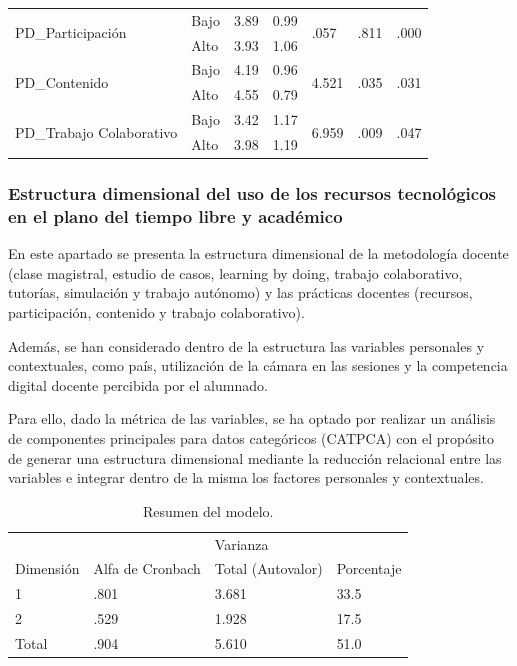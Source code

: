\documentclass[spanish]{textolivre}
\begin{document}
\begin{table}[h]
\begin{threeparttable}
\begin{tabular}{*{7}{l}}
    \multirow{2}{*}{PD\_Participación} & Bajo & 3.89 & 0.99 & \multirow{2}{*}{.057} & \multirow{2}{*}{.811} & \multirow{2}{*}{.000} \\
    & Alto & 3.93 & 1.06 & & & \\
    \multirow{2}{*}{PD\_Contenido} & Bajo & 4.19 & 0.96 & \multirow{2}{*}{4.521} & \multirow{2}{*}{.035} & \multirow{2}{*}{.031} \\
    & Alto & 4.55 & 0.79 & & & \\
    \multirow{2}{*}{PD\_Trabajo Colaborativo} & Bajo & 3.42 & 1.17 & \multirow{2}{*}{6.959} & \multirow{2}{*}{.009} & \multirow{2}{*}{.047} \\
    & Alto & 3.98 & 1.19 & & & \\
    \bottomrule
    \end{tabular}
    \end{threeparttable}
\end{table}

\subsubsection{Estructura dimensional del uso de los recursos tecnológicos en el plano del tiempo libre y académico}

En este apartado se presenta la estructura dimensional de la metodología docente (clase magistral, estudio de casos, learning by doing, trabajo colaborativo, tutorías, simulación y trabajo autónomo) y las prácticas docentes (recursos, participación, contenido y trabajo colaborativo).

Además, se han considerado dentro de la estructura las variables personales y contextuales, como país, utilización de la cámara en las sesiones y la competencia digital docente percibida por el alumnado.  

Para ello, dado la métrica de las variables, se ha optado por realizar un análisis de componentes principales para datos categóricos (CATPCA) con el propósito de generar una estructura dimensional mediante la reducción relacional entre las variables e integrar dentro de la misma los factores personales y contextuales.

\begin{table}[h]
    \centering
    \begin{threeparttable}
    \caption{Resumen del modelo.}
    \label{tab07}
    \begin{tabular}{*{4}{l}}
    \toprule
     & & \multicolumn{2}{l}{Varianza} \\
    Dimensión & Alfa de Cronbach & Total (Autovalor) & Porcentaje \\
    \midrule
    1 & .801 & 3.681 & 33.5 \\
    2 & .529 & 1.928 & 17.5 \\
    Total & .904 & 5.610 & 51.0 \\
    \bottomrule
    \end{tabular}
    \end{threeparttable}
\end{table}
\end{document}
